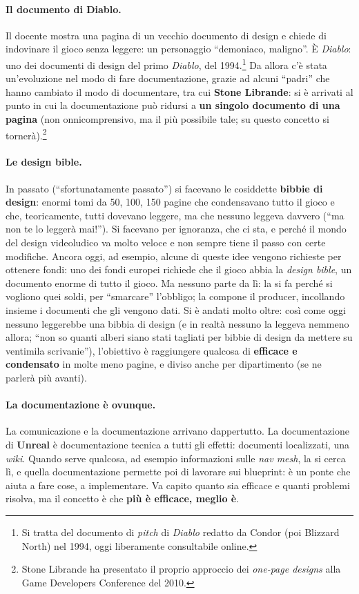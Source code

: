 \paragraph{Il documento di Diablo.} Il docente mostra una pagina di un vecchio
documento di design e chiede di indovinare il gioco senza leggere: un
personaggio ``demoniaco, maligno''. È \emph{Diablo}: uno dei documenti di
design del primo \emph{Diablo}, del 1994.\footnote{Si tratta del documento di
\emph{pitch} di \emph{Diablo} redatto da Condor (poi Blizzard North) nel
1994, oggi liberamente consultabile online.} Da allora c'è stata
un'evoluzione nel modo di fare documentazione, grazie ad alcuni ``padri'' che
hanno cambiato il modo di documentare, tra cui \textbf{Stone Librande}: si è
arrivati al punto in cui la documentazione può ridursi a \textbf{un singolo
documento di una pagina} (non onnicomprensivo, ma il più possibile tale; su
questo concetto si tornerà).\footnote{Stone Librande ha presentato il
proprio approccio dei \emph{one-page designs} alla Game Developers Conference
del 2010.}

\paragraph{Le design bible.} In passato (``sfortunatamente passato'') si
facevano le cosiddette \textbf{bibbie di design}: enormi tomi da 50, 100, 150
pagine che condensavano tutto il gioco e che, teoricamente, tutti dovevano
leggere, ma che nessuno leggeva davvero (``ma non te lo leggerà mai!''). Si
facevano per ignoranza, che ci sta, e perché il mondo del design videoludico
va molto veloce e non sempre tiene il passo con certe modifiche. Ancora oggi,
ad esempio, alcune di queste idee vengono richieste per ottenere fondi: uno
dei fondi europei richiede che il gioco abbia la \emph{design bible}, un
documento enorme di tutto il gioco. Ma nessuno parte da lì: la si fa perché si
vogliono quei soldi, per ``smarcare'' l'obbligo; la compone il producer,
incollando insieme i documenti che gli vengono dati. Si è andati molto oltre:
così come oggi nessuno leggerebbe una bibbia di design (e in realtà nessuno
la leggeva nemmeno allora; ``non so quanti alberi siano stati tagliati per
bibbie di design da mettere su ventimila scrivanie''), l'obiettivo è
raggiungere qualcosa di \textbf{efficace e condensato} in molte meno pagine,
e diviso anche per dipartimento (se ne parlerà più avanti).

\paragraph{La documentazione è ovunque.} La comunicazione e la
documentazione arrivano dappertutto. La documentazione di \textbf{Unreal} è
documentazione tecnica a tutti gli effetti: documenti localizzati, una
\emph{wiki}. Quando serve qualcosa, ad esempio informazioni sulle
\emph{nav mesh}, la si cerca lì, e quella documentazione permette poi di
lavorare sui blueprint: è un ponte che aiuta a fare cose, a implementare. Va
capito quanto sia efficace e quanti problemi risolva, ma il concetto è che
\textbf{più è efficace, meglio è}.

